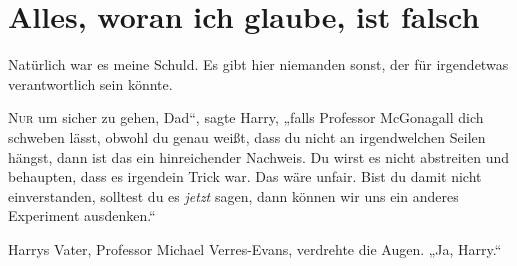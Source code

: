 \chapter{Alles, woran ich glaube, ist falsch}

\begin{chapterOpeningQuote}
Natürlich war es meine Schuld. Es gibt hier niemanden sonst, der für irgendetwas verantwortlich sein könnte.
\end{chapterOpeningQuote}

\lettrine[ante=„]{N}{ur} um sicher zu gehen, Dad“, sagte Harry, „falls Professor McGonagall dich schweben lässt, obwohl du genau weißt, dass du nicht an irgendwelchen Seilen hängst, dann ist das ein hinreichender Nachweis. Du wirst es nicht abstreiten und behaupten, dass es irgendein Trick war. Das wäre unfair. Bist du damit nicht einverstanden, solltest du es \emph{jetzt} sagen, dann können wir uns ein anderes Experiment ausdenken.“

Harrys Vater, Professor Michael Verres-Evans, verdrehte die Augen.
„Ja, Harry.“

